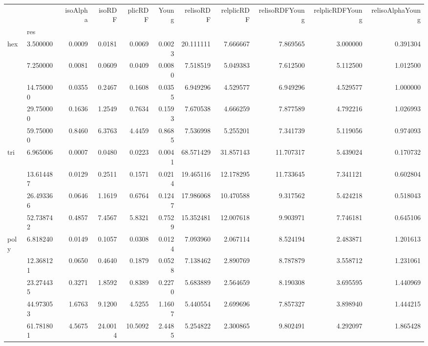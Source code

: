 \begin{tabular}{llrrrrrrrrr}
\toprule
    &           &  isoAlpha &   isoRDF &  plicRDF &   Young &  relisoRDF &  relplicRDF &  relisoRDFYoung &  relplicRDFYoung &  relisoAlphaYoung \\
{} & res &           &          &          &         &            &             &                 &                  &                   \\
\midrule
hex & 3.500000  &    0.0009 &   0.0181 &   0.0069 &  0.0023 &  20.111111 &    7.666667 &        7.869565 &         3.000000 &          0.391304 \\
    & 7.250000  &    0.0081 &   0.0609 &   0.0409 &  0.0080 &   7.518519 &    5.049383 &        7.612500 &         5.112500 &          1.012500 \\
    & 14.750000 &    0.0355 &   0.2467 &   0.1608 &  0.0355 &   6.949296 &    4.529577 &        6.949296 &         4.529577 &          1.000000 \\
    & 29.750000 &    0.1636 &   1.2549 &   0.7634 &  0.1593 &   7.670538 &    4.666259 &        7.877589 &         4.792216 &          1.026993 \\
    & 59.750000 &    0.8460 &   6.3763 &   4.4459 &  0.8685 &   7.536998 &    5.255201 &        7.341739 &         5.119056 &          0.974093 \\
tri & 6.965006  &    0.0007 &   0.0480 &   0.0223 &  0.0041 &  68.571429 &   31.857143 &       11.707317 &         5.439024 &          0.170732 \\
    & 13.614487 &    0.0129 &   0.2511 &   0.1571 &  0.0214 &  19.465116 &   12.178295 &       11.733645 &         7.341121 &          0.602804 \\
    & 26.493366 &    0.0646 &   1.1619 &   0.6764 &  0.1247 &  17.986068 &   10.470588 &        9.317562 &         5.424218 &          0.518043 \\
    & 52.738742 &    0.4857 &   7.4567 &   5.8321 &  0.7529 &  15.352481 &   12.007618 &        9.903971 &         7.746181 &          0.645106 \\
poly & 6.818240  &    0.0149 &   0.1057 &   0.0308 &  0.0124 &   7.093960 &    2.067114 &        8.524194 &         2.483871 &          1.201613 \\
    & 12.368121 &    0.0650 &   0.4640 &   0.1879 &  0.0528 &   7.138462 &    2.890769 &        8.787879 &         3.558712 &          1.231061 \\
    & 23.274435 &    0.3271 &   1.8592 &   0.8389 &  0.2270 &   5.683889 &    2.564659 &        8.190308 &         3.695595 &          1.440969 \\
    & 44.973053 &    1.6763 &   9.1200 &   4.5255 &  1.1607 &   5.440554 &    2.699696 &        7.857327 &         3.898940 &          1.444215 \\
    & 61.781801 &    4.5675 &  24.0014 &  10.5092 &  2.4485 &   5.254822 &    2.300865 &        9.802491 &         4.292097 &          1.865428 \\
\bottomrule
\end{tabular}
